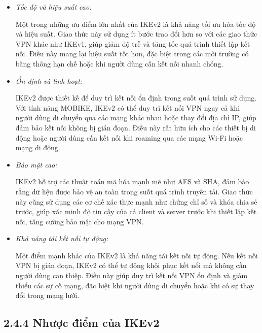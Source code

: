   \begin{itemize}
        \item \textit{Tốc độ và hiệu suất cao:}
        
         Một trong những ưu điểm lớn nhất của IKEv2 là khả năng tối ưu hóa tốc độ và hiệu suất. Giao thức này sử dụng ít bước trao đổi hơn so với các giao thức VPN khác như IKEv1, giúp giảm độ trễ và tăng tốc quá trình thiết lập kết nối. Điều này mang lại hiệu suất tốt hơn, đặc biệt trong các môi trường có băng thông hạn chế hoặc khi người dùng cần kết nối nhanh chóng.
        \item \textit{Ổn định và linh hoạt:}

        IKEv2 được thiết kế để duy trì kết nối ổn định trong suốt quá trình sử dụng. Với tính năng MOBIKE, IKEv2 có thể duy trì kết nối VPN ngay cả khi người dùng di chuyển qua các mạng khác nhau hoặc thay đổi địa chỉ IP, giúp đảm bảo kết nối không bị gián đoạn. Điều này rất hữu ích cho các thiết bị di động hoặc người dùng cần kết nối khi roaming qua các mạng Wi-Fi hoặc mạng di động.
        \item \textit{Bảo mật cao:}

        IKEv2 hỗ trợ các thuật toán mã hóa mạnh mẽ như AES và SHA, đảm bảo rằng dữ liệu được bảo vệ an toàn trong suốt quá trình truyền tải. Giao thức này cũng sử dụng các cơ chế xác thực mạnh như chứng chỉ số và khóa chia sẻ trước, giúp xác minh độ tin cậy của cả client và server trước khi thiết lập kết nối, tăng cường bảo mật cho mạng VPN.

        \item \textit{Khả năng tái kết nối tự động:}

        Một điểm mạnh khác của IKEv2 là khả năng tái kết nối tự động. Nếu kết nối VPN bị gián đoạn, IKEv2 có thể tự động khôi phục kết nối mà không cần người dùng can thiệp. Điều này giúp duy trì kết nối VPN ổn định và giảm thiểu các sự cố mạng, đặc biệt khi người dùng di chuyển hoặc khi có sự thay đổi trong mạng lưới.
    \end{itemize} 

 \subsection*{2.4.4 Nhược điểm của IKEv2}

